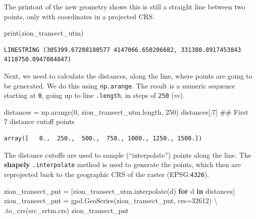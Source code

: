\documentclass[
  letterpaper,
]{krantz}
\newenvironment{Shaded}{\begin{snugshade}}{\end{snugshade}}
\newcommand{\BuiltInTok}[1]{\textcolor[rgb]{0.00,0.23,0.31}{#1}}
\newcommand{\CommentTok}[1]{\textcolor[rgb]{0.37,0.37,0.37}{#1}}
\newcommand{\ControlFlowTok}[1]{\textcolor[rgb]{0.00,0.23,0.31}{\textbf{#1}}}
\newcommand{\DecValTok}[1]{\textcolor[rgb]{0.68,0.00,0.00}{#1}}
\newcommand{\KeywordTok}[1]{\textcolor[rgb]{0.00,0.23,0.31}{\textbf{#1}}}
\newcommand{\NormalTok}[1]{\textcolor[rgb]{0.00,0.23,0.31}{#1}}
\newcommand{\OperatorTok}[1]{\textcolor[rgb]{0.37,0.37,0.37}{#1}}
\begin{document}
The printout of the new geometry shows this is still a straight line
between two points, only with coordinates in a projected CRS.

\begin{Shaded}
\begin{Highlighting}[]
\BuiltInTok{print}\NormalTok{(zion\_transect\_utm)}
\end{Highlighting}
\end{Shaded}

\begin{verbatim}
LINESTRING (305399.67208180577 4147066.650206682, 331380.8917453843 4118750.0947884847)
\end{verbatim}

Next, we need to calculate the distances, along the line, where points
are going to be generated. We do this using \texttt{np.arange}. The
result is a numeric sequence starting at \texttt{0}, going up to line
\texttt{.length}, in steps of \texttt{250} (\(m\)).

\begin{Shaded}
\begin{Highlighting}[]
\NormalTok{distances }\OperatorTok{=}\NormalTok{ np.arange(}\DecValTok{0}\NormalTok{, zion\_transect\_utm.length, }\DecValTok{250}\NormalTok{)}
\NormalTok{distances[:}\DecValTok{7}\NormalTok{]  }\CommentTok{\#\# First 7 distance cutoff points}
\end{Highlighting}
\end{Shaded}

\begin{verbatim}
array([   0.,  250.,  500.,  750., 1000., 1250., 1500.])
\end{verbatim}

The distance cutoffs are used to sample (``interpolate'') points along
the line. The \textbf{shapely} \texttt{.interpolate} method is used to
generate the points, which then are reprojected back to the geographic
CRS of the raster (EPSG:\texttt{4326}).

\begin{Shaded}
\begin{Highlighting}[]
\NormalTok{zion\_transect\_pnt }\OperatorTok{=}\NormalTok{ [zion\_transect\_utm.interpolate(d) }\ControlFlowTok{for}\NormalTok{ d }\KeywordTok{in}\NormalTok{ distances]}
\NormalTok{zion\_transect\_pnt }\OperatorTok{=}\NormalTok{ gpd.GeoSeries(zion\_transect\_pnt, crs}\OperatorTok{=}\DecValTok{32612}\NormalTok{) }\OperatorTok{\textbackslash{}}
\NormalTok{    .to\_crs(src\_srtm.crs)}
\NormalTok{zion\_transect\_pnt}
\end{Highlighting}
\end{Shaded}
\end{document}

